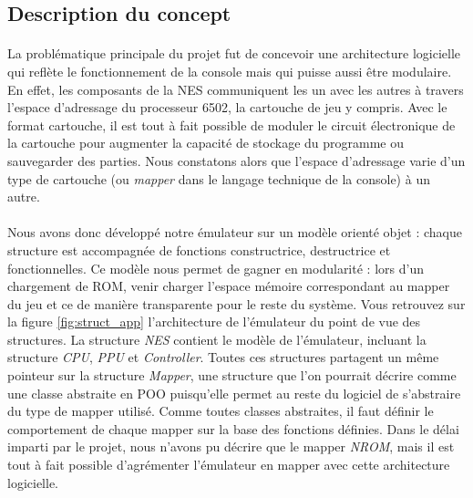 \subsection{Description du concept}

\paragraph{}
La problématique principale du projet fut de concevoir une architecture logicielle qui reflète le fonctionnement de la console mais qui puisse aussi être modulaire. En effet, les composants de la NES communiquent les un avec les autres à travers l'espace d'adressage du processeur 6502, la cartouche de jeu y compris. Avec le format cartouche, il est tout à fait possible de moduler le circuit électronique de la cartouche pour augmenter la capacité de stockage du programme ou sauvegarder des parties. Nous constatons alors que l'espace d'adressage varie d'un type de cartouche (ou \emph{mapper} dans le langage technique de la console) à un autre.

\paragraph{}
Nous avons donc développé notre émulateur sur un modèle orienté objet : chaque structure est accompagnée de fonctions constructrice, destructrice et fonctionnelles. Ce modèle nous permet de gagner en modularité : lors d'un chargement de ROM, venir charger l'espace mémoire correspondant au mapper du jeu et ce de manière transparente pour le reste du système. Vous retrouvez sur la figure \ref{fig:struct_app} l'architecture de l'émulateur du point de vue des structures. La structure \emph{NES} contient le modèle de l'émulateur, incluant la structure \emph{CPU}, \emph{PPU} et \emph{Controller}. Toutes ces structures partagent un même pointeur sur la structure \emph{Mapper}, une structure que l'on pourrait décrire comme une classe abstraite en POO puisqu'elle permet au reste du logiciel de s'abstraire du type de mapper utilisé. Comme toutes classes abstraites, il faut définir le comportement de chaque mapper sur la base des fonctions définies. Dans le délai imparti par le projet, nous n'avons pu décrire que le mapper \emph{NROM}, mais il est tout à fait possible d'agrémenter l'émulateur en mapper avec cette architecture logicielle.

